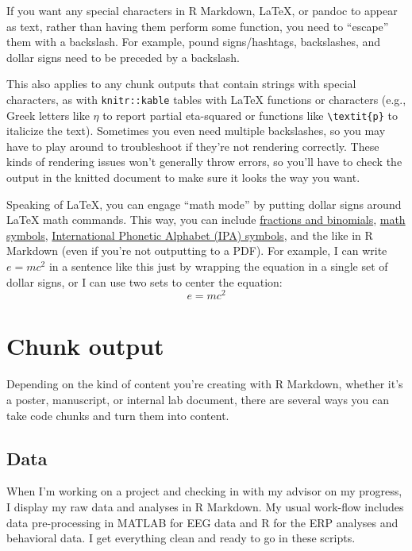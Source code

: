 \documentclass[
]{book}
\begin{document}
If you want any special characters in R Markdown, LaTeX, or pandoc to appear as text, rather than having them perform some function, you need to ``escape'' them with a backslash. For example, pound signs/hashtags, backslashes, and dollar signs need to be preceded by a backslash.

This also applies to any chunk outputs that contain strings with special characters, as with \texttt{knitr::kable} tables with LaTeX functions or characters (e.g., Greek letters like \(\eta\) to report partial eta-squared or functions like \texttt{\textbackslash{}textit\{p\}} to italicize the text). Sometimes you even need multiple backslashes, so you may have to play around to troubleshoot if they're not rendering correctly. These kinds of rendering issues won't generally throw errors, so you'll have to check the output in the knitted document to make sure it looks the way you want.

Speaking of LaTeX, you can engage ``math mode'' by putting dollar signs around LaTeX math commands. This way, you can include \href{https://en.wikibooks.org/wiki/LaTeX/Mathematics\#Fractions_and_Binomials}{fractions and binomials}, \href{https://oeis.org/wiki/List_of_LaTeX_mathematical_symbols}{math symbols}, \href{https://www.tug.org/TUGboat/tb17-2/tb51rei.pdf}{International Phonetic Alphabet (IPA) symbols}, and the like in R Markdown (even if you're not outputting to a PDF). For example, I can write \(e = mc^2\) in a sentence like this just by wrapping the equation in a single set of dollar signs, or I can use two sets to center the equation: \[e = mc^2\]

\hypertarget{chunk-output}{%
\section{Chunk output}\label{chunk-output}}

Depending on the kind of content you're creating with R Markdown, whether it's a poster, manuscript, or internal lab document, there are several ways you can take code chunks and turn them into content.

\hypertarget{dat}{%
\subsection{Data}\label{dat}}

When I'm working on a project and checking in with my advisor on my progress, I display my raw data and analyses in R Markdown. My usual work-flow includes data pre-processing in MATLAB for EEG data and R for the ERP analyses and behavioral data. I get everything clean and ready to go in these scripts.
\end{document}
